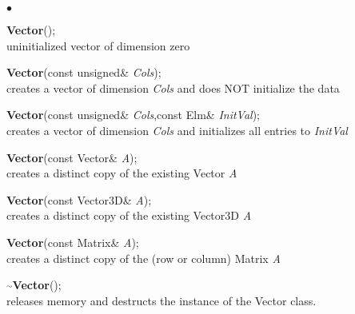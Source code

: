 \documentclass{article}
\newcommand{\Func}[1]{\textbf{#1}}
\newcommand{\var}[1]{\textit{#1}}
\newcommand{\tild}{\ensuremath{\overset{\sim}{~}}}
\newenvironment{LIST}{\begin{list}{$\bullet$}{%
      \setlength{\leftmargin}{2\leftmargin}%
      \setlength{\itemindent}{-1cm}}}%
  {\end{list}}
\begin{document}
\begin{LIST}
 \item \Func{Vector}();\\
  uninitialized vector of dimension zero
 \item \Func{Vector}(const unsigned\& \var{Cols});\\
  creates a vector of dimension \var{Cols} and does NOT initialize the data
 \item \Func{Vector}(const unsigned\& \var{Cols},const Elm\& \var{InitVal});\\
  creates a vector of dimension \var{Cols} and initializes all entries to
  \var{InitVal}
 \item \Func{Vector}(const Vector\& \var{A});\\
  creates a distinct copy of the existing Vector \var{A}
 \item \Func{Vector}(const Vector3D\& \var{A});\\
  creates a distinct copy of the existing Vector3D \var{A}
 \item \Func{Vector}(const Matrix\& \var{A});\\
  creates a distinct copy of the (row or column) Matrix \var{A}
  
 \item \Func{\tild Vector}();\\
  releases memory and destructs the instance of the Vector
  class.\\[.5cm]


\end{LIST}
\end{document}
